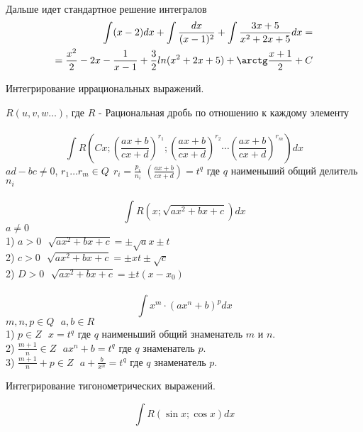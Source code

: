 \\
Дальше идет стандартное решение интегралов
\begin{eqnarray*}
  \int (x - 2)dx + \int \frac{dx}{(x - 1)^2} + \int \frac{3x + 5}{x^2 + 2x + 5}
    dx = \\
  =\frac{x^2}{2} - 2x - \frac{1}{x-1} + \frac{3}{2} ln(x^2 + 2x + 5) + \arctg
    \frac{x + 1}{2} + C
\end{eqnarray*}

\begin{title}[\Large]
  Интегрирование иррациональных выражений.
\end{title}

$R(u, v, w \ldots)$, где $R$ - Рациональная дробь по отношению к каждому
элементу\\

\\
\[
\int R \left( Cx; \left( \frac{ax + b}{cx + d} \right)^{r_1};
\left( \frac{ax + b}{cx + d} \right)^{r_2} \cdots
\left( \frac{ax + b}{cx + d} \right)^{r_m} \right)dx
\]
$ad - bc \neq 0$, $r_1 \ldots r_m\in Q ~~ r_i = \frac{p_i}{n_i}$
$\left( \frac{ax + b}{cx + d} \right) = t^q$ где $q$ наименьший общий делитель
  $n_i$\\

\\
\[\int R \left(x; \sqrt{ax^2 + bx + c} \right)dx\]
$a \neq 0$\\
1) $a > 0 ~~~ \sqrt{ax^2 + bx + c} = \pm \sqrt{a}x \pm t$\\
2) $c > 0 ~~~ \sqrt{ax^2 + bx + c} = \pm xt \pm \sqrt{c}$\\
2) $D > 0 ~~~ \sqrt{ax^2 + bx + c} = \pm t (x - x_0)$\\

\\
\[\int x^m \cdot (ax^n + b)^p dx\]
$m, n, p \in Q ~~~ a, b \in R$\\
1) $p \in Z ~~~ x = t^q$ где $q$ наименьший общий знаменатель $m$ и $n$.\\
2) $\frac{m+1}{n} \in Z ~~~ ax^n + b = t^q$ где $q$ знаменатель $p$.\\
3) $\frac{m+1}{n} + p \in Z ~~~ a + \frac{b}{x^n} = t^q$ где $q$ знаменатель
  $p$.\\

\begin{title}[\Large]
  Интегрирование тигонометрических выражений.
\end{title}

\[ \int R(\sin x; \cos x)dx \]

